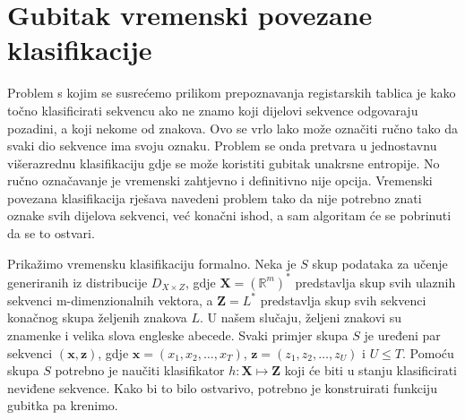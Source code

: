 \documentclass[times, utf8, diplomski]{fer}
\begin{document}
\section{Gubitak vremenski povezane klasifikacije}
Problem s kojim se susrećemo prilikom prepoznavanja registarskih tablica je kako točno klasificirati sekvencu ako ne znamo koji dijelovi sekvence odgovaraju pozadini, a koji nekome od znakova. Ovo se vrlo lako može označiti ručno tako da svaki dio sekvence ima svoju oznaku. Problem se onda pretvara u jednostavnu višerazrednu klasifikaciju gdje se može koristiti gubitak unakrsne entropije. No ručno označavanje je vremenski zahtjevno i definitivno nije opcija. Vremenski povezana klasifikacija  rješava navedeni problem tako da nije potrebno znati oznake svih dijelova sekvenci, već konačni ishod, a sam algoritam će se pobrinuti da se to ostvari.

Prikažimo vremensku klasifikaciju formalno. Neka je $S$ skup podataka za učenje generiranih iz distribucije $D_{X \times Z}$, gdje $\mathbf{X} = (\mathbb{R}^m)^*$ predstavlja skup svih ulaznih sekvenci m-dimenzionalnih vektora, a $\mathbf{Z} = L^*$ predstavlja skup svih sekvenci konačnog skupa željenih znakova $L$. U našem slučaju, željeni znakovi su znamenke i velika slova engleske abecede. Svaki primjer skupa $S$ je uređeni par sekvenci $(\pmb{\mathbf{x}}, \pmb{\mathbf{z}})$, gdje $\pmb{\mathbf{x}} = (x_1, x_2, \dots, x_T)$, $\pmb{\mathbf{z}} = (z_1, z_2, \dots, z_U)$ i $U \leq T$. Pomoću skupa $S$ potrebno je naučiti klasifikator $h: \mathbf{X} \mapsto \mathbf{Z}$ koji će biti u stanju klasificirati neviđene sekvence. Kako bi to bilo ostvarivo, potrebno je konstruirati funkciju gubitka pa krenimo.
\end{document}

